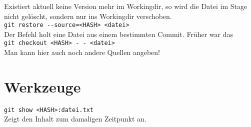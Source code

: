 \documentclass[oneside]{scrreprt}
\begin{document}
Existiert aktuell keine Version mehr im Workingdir, 
so wird die Datei im Stage nicht gelöscht, sondern nur
ins Workingdir verschoben.
~\\


\verb+git restore --source=<HASH> <datei>+\\
Der Befehl holt eine Datei aus einem bestimmten Commit.
Früher war das\\
 \texttt{git checkout <HASH> -\,- <datei>}\\
 Man kann hier auch noch andere Quellen angeben!


\section*{Werkzeuge}

\verb+git show <HASH>:datei.txt+\\
Zeigt den Inhalt zum damaligen Zeitpunkt an.
\end{document}
